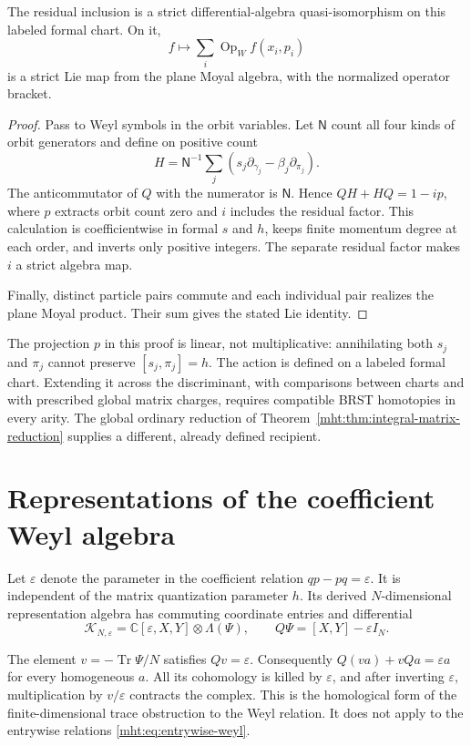\begin{proposition}\label{mht:prop:formal-brst-slice}
The residual inclusion is a strict differential-algebra
quasi-isomorphism on this labeled formal chart. On it,
\[
 f\longmapsto\sum_i\operatorname{Op}_Wf(x_i,p_i)
\]
is a strict Lie map from the plane Moyal algebra, with the
normalized operator bracket.
\end{proposition}
\begin{proof}
Pass to Weyl symbols in the orbit variables. Let $\mathsf N$
count all four kinds of orbit generators and define on positive
count
\[
 H=\mathsf N^{-1}\sum_j
       (s_j\partial_{\gamma_j}-\beta_j\partial_{\pi_j}).
\]
The anticommutator of $Q$ with the numerator is $\mathsf N$.
Hence $QH+HQ=1-ip$, where $p$ extracts orbit count zero
and $i$ includes the residual factor. This calculation is
coefficientwise in formal $s$ and $h$, keeps finite momentum
degree at each order, and inverts only positive integers.
The separate residual factor makes $i$ a strict algebra map.

Finally, distinct particle pairs commute and each individual
pair realizes the plane Moyal product. Their sum gives the
stated Lie identity.
\end{proof}

The projection $p$ in this proof is linear, not multiplicative:
annihilating both $s_j$ and $\pi_j$ cannot preserve
$[s_j,\pi_j]=h$. The action is defined on a labeled formal
chart. Extending it across the discriminant, with comparisons
between charts and with prescribed global matrix charges,
requires compatible BRST homotopies in every arity. The
global ordinary reduction of
Theorem~\ref{mht:thm:integral-matrix-reduction} supplies a
different, already defined recipient.

\section{Representations of the coefficient Weyl algebra}

Let $\varepsilon$ denote the parameter in the coefficient
relation $qp-pq=\varepsilon$. It is independent of the matrix
quantization parameter $h$. Its derived $N$-dimensional
representation algebra has commuting coordinate entries and
differential
\[
 \mathcal K_{N,\varepsilon}
 =\mathbb C[\varepsilon,X,Y]\otimes\Lambda(\Psi),\qquad
 Q\Psi=[X,Y]-\varepsilon I_N.
\]

The element $v=-\operatorname{Tr}\Psi/N$ satisfies
$Qv=\varepsilon$. Consequently
$Q(va)+vQa=\varepsilon a$ for every homogeneous $a$.
All its cohomology is killed by $\varepsilon$, and after
inverting $\varepsilon$, multiplication by $v/\varepsilon$
contracts the complex. This is the homological form of
the finite-dimensional trace obstruction to the Weyl relation.
It does not apply to the entrywise relations
\eqref{mht:eq:entrywise-weyl}.

